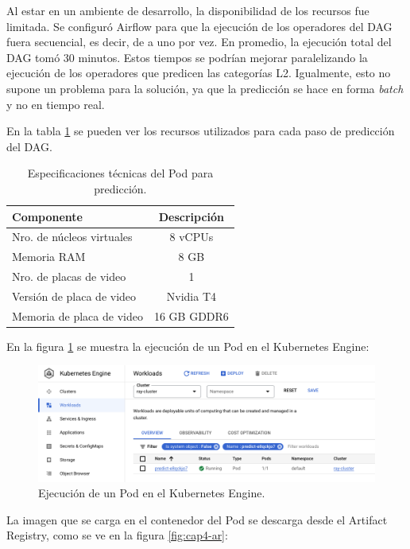 Al estar en un ambiente de desarrollo, la disponibilidad de los recursos fue limitada. Se configuró Airflow para que la ejecución de los operadores del DAG fuera secuencial, es decir, de a uno por vez. En promedio, la ejecución total del DAG tomó 30 minutos. Estos tiempos se podrían mejorar paralelizando la ejecución de los operadores que predicen las categorías L2. Igualmente, esto no supone un problema para la solución, ya que la predicción se hace en forma \textit{batch} y no en tiempo real.

En la tabla \ref{tab:gke} se pueden ver los recursos utilizados para cada paso de predicción del DAG.
\begin{table}[h]
	\centering
	\caption[Especificaciones técnicas Pod]{Especificaciones técnicas del Pod para predicción.}
	\begin{tabular}{l c}    
		\toprule
		\textbf{Componente}			& 			\textbf{Descripción}  \\
		\midrule	
		Nro. de núcleos virtuales	& 			8 vCPUs  \\
		Memoria RAM					&			8 GB \\
		Nro. de placas de video 	& 			1  \\
		Versión de placa de video	&			Nvidia T4 \\
		Memoria de placa de video	& 			16 GB GDDR6  \\
		\bottomrule
		\hline
	\end{tabular}
	\label{tab:gke}
\end{table}

En la figura \ref{fig:cap4-pod} se muestra la ejecución de un Pod en el Kubernetes Engine:

\begin{figure}[htbp]
	\centering
	\includegraphics[width=1\textwidth]{./Figures/cap4-pod.png}
	\caption{Ejecución de un Pod en el Kubernetes Engine.}
	\label{fig:cap4-pod}
\end{figure}

La imagen que se carga en el contenedor del Pod se descarga desde el Artifact Registry, como se ve en la figura \ref{fig:cap4-ar}:

